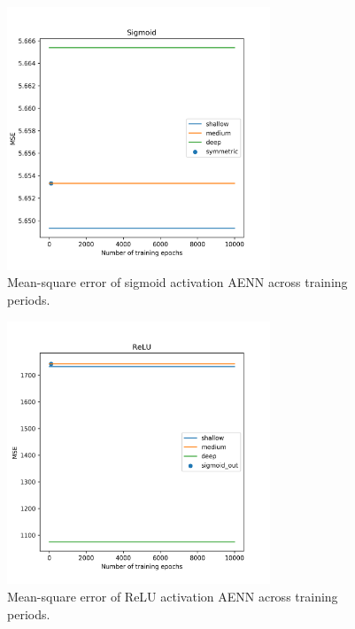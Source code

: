 \documentclass{article}
\begin{document}
\begin{figure}
\centering
\includegraphics[width=0.7\textwidth]{../images/aenn_results_sigmoid.png}
\caption{Mean-square error of sigmoid activation AENN across training periods.}
\label{aenn_sigmoid}
\end{figure}

\begin{figure}
\centering
\includegraphics[width=0.7\textwidth]{../images/aenn_results_relu.png}
\caption{Mean-square error of ReLU activation AENN across training periods.}
\label{aenn_relu}
\end{figure}
\end{document}

